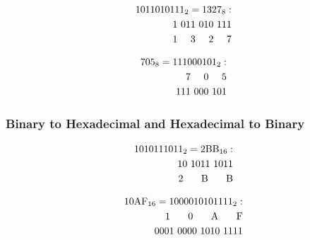 \vspace{-\baselineskip}

\begin{multicols}{2}

  \begin{align*}
    {1011010111}_{2} = {1327}_{8} : \\
    \hphantom{}1\hphantom{\ }011\hphantom{\ }010\hphantom{\ }111 \\
    \hphantom{}1\hphantom{\ 00}3\hphantom{\ 00}2\hphantom{\ 00}7 \\
  \end{align*}

  \columnbreak

  \begin{align*}
    {705}_{8} = {111000101}_{2} : \\
    \hphantom{00}7\hphantom{\ 00}0\hphantom{\ 00}5 \\
    \hphantom{}111\hphantom{\ }000\hphantom{\ }101 \\
  \end{align*}

\end{multicols}

\subsubsection{Binary to Hexadecimal and Hexadecimal to Binary}

\vspace{-\baselineskip}

\begin{multicols}{2}

  \begin{align*}
    {1010111011}_{2} = \text{2BB}_{16} : \\
          \hphantom{}10\hphantom{\ }1011\hphantom{\ }1011  \\
    \text{\hphantom{0}2\hphantom{\ 000}B\hphantom{\ 000}B} \\
  \end{align*}

  \columnbreak

  \begin{align*}
    \text{10AF}_{16} = {1000010101111}_{2} : \\
    \text{\hphantom{000}1\hphantom{\ 000}0\hphantom{\ 000}A\hphantom{\ 000}F} \\
          \hphantom{}0001\hphantom{\ }0000\hphantom{\ }1010\hphantom{\ }1111  \\
  \end{align*}

\end{multicols}


